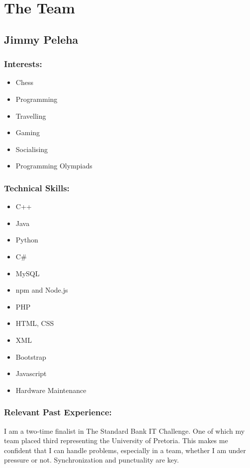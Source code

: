 \section{The Team}

\subsection{Jimmy Peleha}

\subsubsection{Interests:}
\begin{itemize}
	\item Chess
	\item Programming
	\item Travelling
	\item Gaming
	\item Socialising
	\item Programming Olympiads
\end{itemize}

\subsubsection{Technical Skills:}
\begin{itemize}
	\item C++
	\item Java
	\item Python
	\item C\#
	\item MySQL
	\item npm and Node.js
	\item PHP
	\item HTML, CSS
	\item XML
	\item Bootstrap
	\item Javascript
	\item Hardware Maintenance 
\end{itemize}


\subsubsection{Relevant Past Experience:}
\par{I am a two-time finalist in The Standard Bank IT Challenge. One of which my team placed third representing the University of Pretoria. This makes me confident that I can handle problems, especially in a team, whether I am under pressure or not. Synchronization and punctuality are key.}

